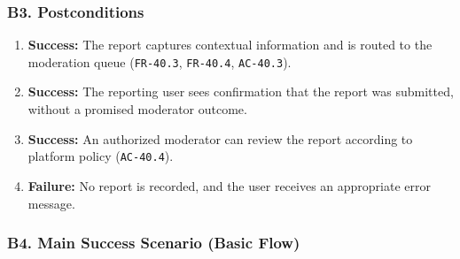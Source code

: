 \documentclass[12pt]{article}
\begin{document}
\hypertarget{sec:b3-postconditions}{}
\subsubsection*{B3. Postconditions}
\par\medskip

\begin{enumerate}
\item \textbf{Success:} The report captures contextual information and is routed to the moderation queue (\texttt{FR-40.3}, \texttt{FR-40.4}, \texttt{AC-40.3}).
\item \textbf{Success:} The reporting user sees confirmation that the report was submitted, without a promised moderator outcome.
\item \textbf{Success:} An authorized moderator can review the report according to platform policy (\texttt{AC-40.4}).
\item \textbf{Failure:} No report is recorded, and the user receives an appropriate error message.
\end{enumerate}
\par\medskip

\hypertarget{sec:b4-main-success-scenario-basic-flow}{}
\subsubsection*{B4. Main Success Scenario (Basic Flow)}
\par\medskip
\end{document}
